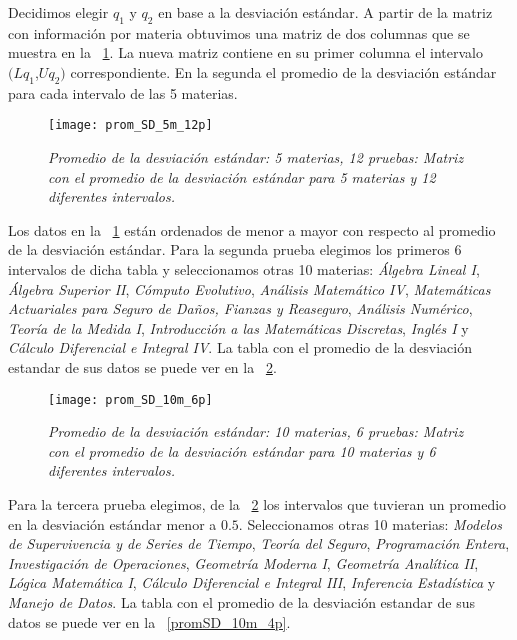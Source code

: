 Decidimos elegir $q_{1}$ y $q_{2}$ en base a la desviación estándar. A partir de la matriz con información por materia obtuvimos una matriz de dos columnas que se muestra en la \figurename{~\ref{promSD_5m_12p}}. La nueva matriz contiene en su primer columna el intervalo $(Lq_{1}$,$Uq_{2})$ correspondiente. En la segunda el promedio de la desviación estándar para cada intervalo de las 5 materias.

\begin{figure}[H]
\centering
\texttt{[image: prom\_SD\_5m\_12p]} %
\caption[\textit{Promedio de la desviación estándar: 5 materias, 12 pruebas}]{\textit{Promedio de la desviación estándar: 5 materias, 12 pruebas: Matriz con el promedio de la desviación estándar para 5 materias y 12 diferentes intervalos.}}\label{promSD_5m_12p}
\end{figure}


Los datos en la \figurename{~\ref{promSD_5m_12p}} están ordenados de menor a mayor con respecto al promedio de la desviación estándar. Para la segunda prueba elegimos los primeros 6 intervalos de dicha tabla y seleccionamos otras 10 materias: \textit{Álgebra Lineal I}, \textit{Álgebra Superior II}, \textit{Cómputo Evolutivo}, \textit{Análisis Matemático IV}, \textit{Matemáticas Actuariales para Seguro de Daños, Fianzas y Reaseguro}, \textit{Análisis Numérico}, \textit{Teoría de la Medida I}, \textit{Introducción a las Matemáticas Discretas}, \textit{Inglés I} y \textit{Cálculo Diferencial e Integral IV}. La tabla con el promedio de la desviación estandar de sus datos se puede ver en la \figurename{~\ref{promSD_10m_6p}}.


\begin{figure}[H]
\centering
\texttt{[image: prom\_SD\_10m\_6p]} %
\caption[\textit{Promedio de la desviación estándar: 10 materias, 6 pruebas}]{\textit{Promedio de la desviación estándar: 10 materias, 6 pruebas: Matriz con el promedio de la desviación estándar para 10 materias y 6 diferentes intervalos.}}\label{promSD_10m_6p}
\end{figure}


Para la tercera prueba elegimos, de la \figurename{~\ref{promSD_10m_6p}} los intervalos que tuvieran un promedio en la desviación estándar menor a $0.5$. Seleccionamos otras 10 materias: \textit{Modelos de Supervivencia y de Series de Tiempo}, \textit{Teoría del Seguro}, \textit{Programación Entera}, \textit{Investigación de Operaciones}, \textit{Geometría Moderna I}, \textit{Geometría Analítica II}, \textit{Lógica Matemática I}, \textit{Cálculo Diferencial e Integral III}, \textit{Inferencia Estadística} y \textit{Manejo de Datos}. La tabla con el promedio de la desviación estandar de sus datos se puede ver en la \figurename{~\ref{promSD_10m_4p}}.


